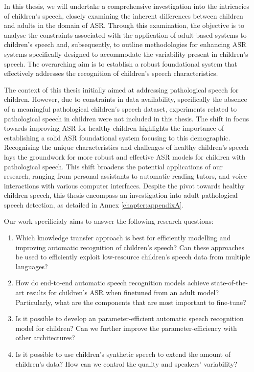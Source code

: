 In this thesis, we will undertake a comprehensive investigation into the intricacies of children's speech, closely examining the inherent differences between children and adults in the domain of ASR. Through this examination, the objective is to analyse the constraints associated with the application of adult-based systems to children's speech and, subsequently, to outline methodologies for enhancing ASR systems specifically designed to accommodate the variability present in children's speech. The overarching aim is to establish a robust foundational system that effectively addresses the recognition of children's speech characteristics.

The context of this thesis initially aimed at addressing pathological speech for children. However, due to constraints in data availability, specifically the absence of a meaningful pathological children's speech dataset, experiments related to pathological speech in children were not included in this thesis. 
The shift in focus towards improving ASR for healthy children highlights the importance of establishing a solid ASR foundational system focusing to this demographic. Recognising the unique characteristics and challenges of healthy children's speech lays the groundwork for more robust and effective ASR models for children with pathological speech. This shift broadens the potential applications of our research, ranging from personal assistants to automatic reading tutors, and voice interactions with various computer interfaces. Despite the pivot towards healthy children speech, this thesis encompass an investigation into adult pathological speech detection, as detailed in Annex \ref{chapter:appendixA}.


Our work specificialy aims to answer the following research questions:
\begin{enumerate} 
\item Which knowledge transfer approach is best for efficiently modelling and improving automatic recognition of children's speech? Can these approaches be used to efficiently exploit low-resource children's speech data from multiple languages?
\item  How do end-to-end automatic speech recognition models achieve state-of-the-art results for children's ASR when finetuned from an adult model? Particularly, what are the components that are most important to fine-tune?
\item Is it possible to develop an parameter-efficient automatic speech recognition model for children? Can we further improve the parameter-efficiency with other architectures? 
\item Is it possible to use children's synthetic speech to extend the amount of children's data? How can we control the quality and speakers’ variability?
\end{enumerate}

